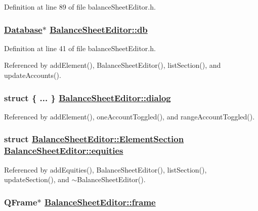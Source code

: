 Definition at line 89 of file balance\-Sheet\-Editor.h.\hypertarget{classBalanceSheetEditor_r0}{
\subsubsection[db]{\setlength{\rightskip}{0pt plus 5cm}\hyperlink{classDatabase}{Database}$\ast$ \hyperlink{classBalanceSheetEditor_r0}{Balance\-Sheet\-Editor::db}}}
\label{classBalanceSheetEditor_r0}


Definition at line 41 of file balance\-Sheet\-Editor.h.

Referenced by add\-Element(), Balance\-Sheet\-Editor(), list\-Section(), and update\-Accounts().\hypertarget{classBalanceSheetEditor_r33}{
\subsubsection[dialog]{\setlength{\rightskip}{0pt plus 5cm}struct \{ ... \}   \hyperlink{classBalanceSheetEditor_r33}{Balance\-Sheet\-Editor::dialog}}}
\label{classBalanceSheetEditor_r33}




Referenced by add\-Element(), one\-Account\-Toggled(), and range\-Account\-Toggled().\hypertarget{classBalanceSheetEditor_r6}{
\subsubsection[equities]{\setlength{\rightskip}{0pt plus 5cm}struct \hyperlink{structBalanceSheetEditor_1_1ElementSection}{Balance\-Sheet\-Editor::Element\-Section}  \hyperlink{classBalanceSheetEditor_r6}{Balance\-Sheet\-Editor::equities}}}
\label{classBalanceSheetEditor_r6}




Referenced by add\-Equities(), Balance\-Sheet\-Editor(), list\-Section(), update\-Section(), and $\sim$Balance\-Sheet\-Editor().\hypertarget{classBalanceSheetEditor_r2}{
\subsubsection[frame]{\setlength{\rightskip}{0pt plus 5cm}QFrame$\ast$ \hyperlink{classBalanceSheetEditor_r2}{Balance\-Sheet\-Editor::frame}}}
\label{classBalanceSheetEditor_r2}


